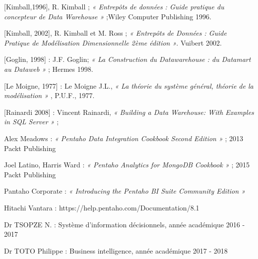 \documentclass[12pt,a4paper,oneside]{book}
\begin{document}
\begin{thebibliography}{9}
	
	[Kimball,1996], R. Kimball ; \emph{« Entrepôts de données : Guide pratique du concepteur de
Data Warehouse » };Wiley Computer Publishing 1996.
	
	
	[Kimball, 2002], R. Kimball et M. Ross ; \emph{« Entrepôts de Données : Guide Pratique de
Modélisation Dimensionnelle 2ème édition »}. Vuibert 2002.
	
	
	 [Goglin, 1998] : J.F. Goglin;\emph{ « La Construction du Datawarehouse : du Datamart au
Dataweb »} ; Hermes 1998.
	
	 [Le Moigne, 1977] : Le Moigne J.L., \emph{« La théorie du système général, théorie de la
modélisation »} , P.U.F., 1977.
	
	  [Rainardi 2008]  : Vincent Rainardi, \emph{« Building a Data Warehouse: With Examples in SQL Server »} ; 
	 
	  Alex Meadows : \emph{« Pentaho Data Integration Cookbook Second Edition »} ; 2013 Packt Publishing
	 
	  Joel Latino, Harris Ward : \emph{« Pentaho Analytics for MongoDB Cookbook »} ; 2015 Packt Publishing 
	
	  Pantaho Corporate : \emph{« Introducing the Pentaho BI Suite Community Edition »}
	 
	  Hitachi Vantara : https://help.pentaho.com/Documentation/8.1
	 
	  Dr TSOPZE N. : Système d'information décisionnels, année académique 2016 - 2017
	 
	  Dr TOTO Philippe : Business intelligence, année académique 2017 - 2018
	  
	
\end{thebibliography}







\appendix














\renewcommand{\contentsname}{Table des matières} 
\setcounter{tocdepth}{3}
\tableofcontents
{}
\end{document}
